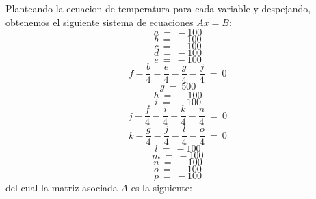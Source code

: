 Planteando la ecuacion de temperatura para cada variable y despejando, obtenemos el siguiente sistema de ecuaciones $Ax=B$:
\begin{equation}
 a\ =\ -100
\end{equation}
\begin{equation}
 b\ =\ -100
\end{equation}
\begin{equation}
 c\ =\ -100
\end{equation}
\begin{equation}
 d\ =\ -100
\end{equation}
\begin{equation}
 e\ =\ -100
\end{equation}
\begin{equation}
 f - \frac{b}{4} - \frac{e}{4} - \frac{g}{4} - \frac{j}{4}\ =\ 0
\end{equation}
\begin{equation}
 g\ =\ 500
\end{equation}
\begin{equation}
 h\ =\ -100
\end{equation}
\begin{equation}
 i\ =\ -100
\end{equation}
\begin{equation}
 j- \frac{f}{4} - \frac{i}{4} - \frac{k}{4} - \frac{n}{4}\ =\ 0
\end{equation}
\begin{equation}
 k- \frac{g}{4} - \frac{j}{4} - \frac{l}{4} - \frac{o}{4}\ =\ 0
\end{equation}
\begin{equation}
 l\ =\ -100
\end{equation}
\begin{equation}
 m\ =\ -100
\end{equation}
\begin{equation}
 n\ =\ -100
\end{equation}
\begin{equation}
 o\ =\ -100
\end{equation}
\begin{equation}
 p\ =\ -100
\end{equation}
 del cual la matriz asociada $A$ es la siguiente:
